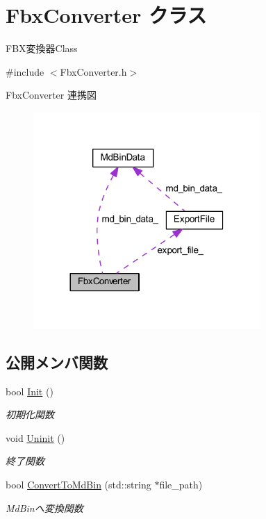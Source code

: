 \hypertarget{class_fbx_converter}{}\section{Fbx\+Converter クラス}
\label{class_fbx_converter}


F\+B\+X変換器\+Class  




{\ttfamily \#include $<$Fbx\+Converter.\+h$>$}



Fbx\+Converter 連携図
\nopagebreak
\begin{figure}[H]
\begin{center}
\leavevmode
\includegraphics[width=245pt]{class_fbx_converter__coll__graph}
\end{center}
\end{figure}
\subsection*{公開メンバ関数}
\begin{DoxyCompactItemize}
\item 
bool \mbox{\hyperlink{class_fbx_converter_ad42745849ed5fbd2a6b332004a21a667}{Init}} ()
\begin{DoxyCompactList}\small\item\em 初期化関数 \end{DoxyCompactList}\item 
void \mbox{\hyperlink{class_fbx_converter_ab41f9b165cb34a294bb2c5da778f542b}{Uninit}} ()
\begin{DoxyCompactList}\small\item\em 終了関数 \end{DoxyCompactList}\item 
bool \mbox{\hyperlink{class_fbx_converter_aecd6ebf6aec9616bd609f6ebfc3a557e}{Convert\+To\+Md\+Bin}} (std\+::string $\ast$file\+\_\+path)
\begin{DoxyCompactList}\small\item\em Md\+Binへ変換関数 \end{DoxyCompactList}\end{DoxyCompactItemize}
